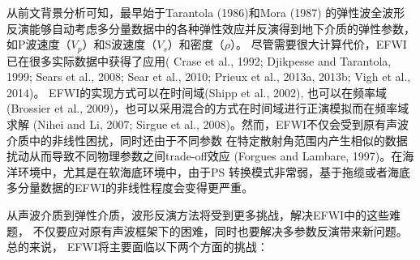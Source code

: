 从前文背景分析可知，最早始于Tarantola (1986)\cite{tarantola:1986}和Mora (1987)\cite{mora:1987}
的弹性波全波形反演能够自动考虑多分量数据中的各种弹性效应并反演得到地下介质的弹性参数，如P波速度（$V_p$）和S波速度（$V_s$）和密度（$\rho$）。
尽管需要很大计算代价，EFWI已在很多实际数据中获得了应用(
Crase et al., 1992\cite{crase1992nonlinear}; Djikpesse and Tarantola,
1999\cite{djikpesse.tarantola:1999}; Sears et al., 2008\cite{sears2008}; Sear et al.,
2010\cite{sears:2010}; Prieux et al., 2013a\cite{prieux:2013a}, 2013b\cite{prieux:2013b}; Vigh et al.,
2014\cite{vigh:2014})。
EFWI的实现方式可以在时间域(Shipp et al., 2002\cite{shipp:2002}),
也可以在频率域(Brossier et al., 2009\cite{brossier2009})，也可以采用混合的方式在时间域进行正演模拟而在频率域求解
(Nihei and Li, 2007\cite{nihei.li:2007}; Sirgue et al.,
2008\cite{sirgue:2008})。然而，EFWI不仅会受到原有声波介质中的非线性困扰，同时还由于不同参数
在特定散射角范围内产生相似的数据扰动从而导致不同物理参数之间trade-off效应
(Forgues and Lambare, 1997\cite{forgues.lambare:1997})。在海洋环境中，尤其是在软海底环境中，由于PS
转换模式非常弱，基于拖缆或者海底多分量数据的EFWI的非线性程度会变得更严重\cite{sears2008}。

从声波介质到弹性介质，波形反演方法将受到更多挑战，解决EFWI中的这些难题，
不仅要应对原有声波框架下的困难，同时也要解决多参数反演带来新问题。总的来说，
EFWI将主要面临以下两个方面的挑战：

